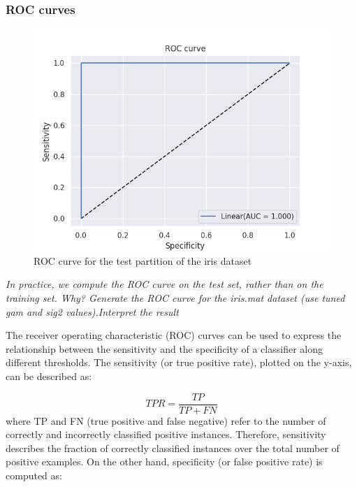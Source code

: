 \documentclass{article}
\begin{document}
\subsubsection{ ROC curves}

\begin{figure}[]

            \includegraphics[width=\linewidth]{roc_iris}
      
        \caption{ ROC curve for the test partition of the iris dataset }        
                   
        \label{fig:roc}
    \end{figure}


\textit{In practice, we compute the ROC curve on the test set, rather than on the training
set. Why? Generate the ROC curve for the iris.mat dataset (use tuned gam and sig2 values).Interpret the result}

The receiver operating characteristic (ROC) curves can be used to express the relationship between the sensitivity and the specificity of a classifier along different thresholds. The sensitivity (or true positive rate), plotted on the y-axis, can be described as:

\begin{equation}
TPR = \frac{TP}{TP+FN}
\end{equation}
where TP and FN (true positive and false negative) refer to the number of correctly and incorrectly classified positive instances. Therefore, sensitivity describes the fraction of correctly classified instances over the total number of positive examples. On the other hand, specificity (or false positive rate) is computed as:
\end{document}
